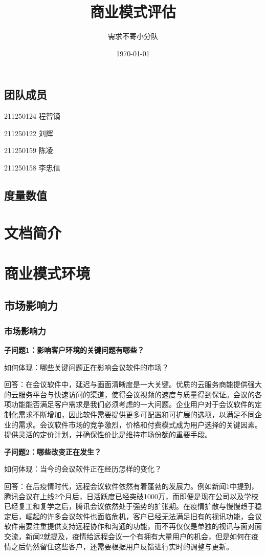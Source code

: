 \documentclass[a4paper,12pt]{article}
\title{商业模式评估}
\author{需求不寄小分队}
\date{\today}
\begin{document}
    \maketitle

    \tableofcontents


    \subsection{团队成员}
    211250124 程智镝

    211250122 刘辉

    211250159 陈凌

    211250158 李忠信
    \subsection{度量数值}

    \section{文档简介}
    

    \section{商业模式环境}
    \subsection{市场影响力}
    \subsubsection{市场影响力}
    \textbf{子问题1：影响客户环境的关键问题有哪些？}
    
    如何体现：哪些关键问题正在影响会议软件的市场？
    
    回答：在会议软件中，延迟与画⾯清晰度是⼀⼤关键。优质的云服务商能提供强⼤的云服务平台与快速访问的渠道，使得会议视频的速度与质量得到保证。会议的各项功能能否满⾜客户需求是我们必须考虑的⼀⼤问题。企业用户对于会议软件的定制化需求不断增加，因此软件需要提供更多可配置和可扩展的选项，以满足不同企业的需求。会议软件市场的竞争激烈，价格和付费模式成为用户选择的关键因素。提供灵活的定价计划，并确保性价比是维持市场份额的重要手段。
    
    \textbf{子问题2：哪些改变正在发生？}

    如何体现：当今的会议软件正在经历怎样的变化？

    回答：在后疫情时代，远程会议软件依然有着蓬勃的发展力。例如新闻1中提到，腾讯会议在上线2个⽉后，⽇活跃度已经突破1000万，⽽即便是现在公司以及学校已经复⼯和复学之后，腾讯会议依然处于强势的扩张期。在疫情扩散与慢慢趋于稳定后，崛起的许多会议软件也⾯临危机，客户已经⽆法满⾜旧有的视讯功能，会议软件需要注重提供支持远程协作和沟通的功能，而不再仅仅是单独的视讯与⾯对⾯交流，新闻2就提及，疫情给远程会议⼀个有拥有⼤量⽤户的机会，但是如何在疫情之后仍然留住这些客户，还需要根据⽤户反馈进⾏实时的调整与更新。
\end{document}
